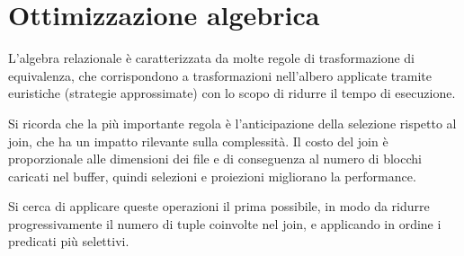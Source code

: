\section{Ottimizzazione algebrica}
L'algebra relazionale è caratterizzata da molte regole di trasformazione di equivalenza, che corrispondono a trasformazioni nell'albero applicate tramite euristiche (strategie approssimate) con lo scopo di ridurre il tempo di esecuzione.

Si ricorda che la più importante regola è l'anticipazione della selezione rispetto al join, che ha un impatto rilevante sulla complessità. Il costo del join è proporzionale alle dimensioni dei file e di conseguenza al numero di blocchi caricati nel buffer, quindi selezioni e proiezioni migliorano la performance.

Si cerca di applicare queste operazioni il prima possibile, in modo da ridurre progressivamente il numero di tuple coinvolte nel join, e applicando in ordine i predicati più selettivi.
